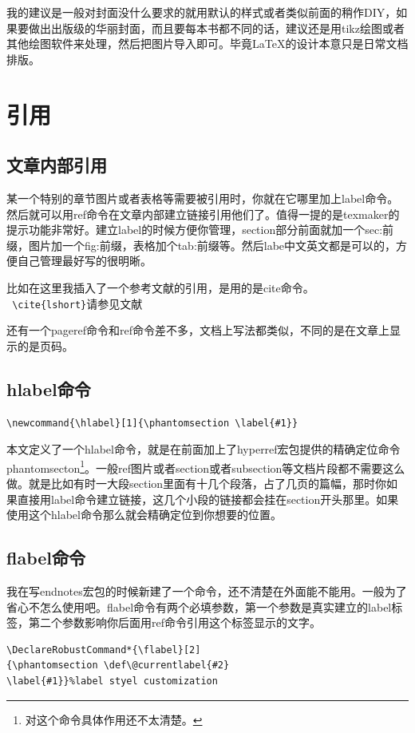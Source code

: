 \documentclass[11pt,oneside]{book}
\begin{document}
我的建议是一般对封面没什么要求的就用默认的样式或者类似前面的稍作DIY，如果要做出出版级的华丽封面，而且要每本书都不同的话，建议还是用tikz绘图或者其他绘图软件来处理，然后把图片导入即可。毕竟\LaTeX 的设计本意只是日常文档排版。





\chapter{引用}
\section{文章内部引用}
某一个特别的章节图片或者表格等需要被引用时，你就在它哪里加上label命令。然后就可以用ref命令在文章内部建立链接引用他们了。值得一提的是texmaker的提示功能非常好。建立label的时候方便你管理，section部分前面就加一个sec:前缀，图片加一个fig:前缀，表格加个tab:前缀等。然后labe中文英文都是可以的，方便自己管理最好写的很明晰。

比如在这里我插入了一个参考文献的引用，是用的是cite命令。\\
\verb+ \cite{lshort}+请参见文献\cite{lshort}

还有一个pageref命令和ref命令差不多，文档上写法都类似，不同的是在文章上显示的是页码。

\section{hlabel命令}
\begin{Verbatim}
\newcommand{\hlabel}[1]{\phantomsection \label{#1}}
\end{Verbatim}

本文定义了一个hlabel命令，就是在前面加上了hyperref宏包提供的精确定位命令phantomsecton\footnote{对这个命令具体作用还不太清楚。}。一般ref图片或者section或者subsection等文档片段都不需要这么做。就是比如有时一大段section里面有十几个段落，占了几页的篇幅，那时你如果直接用label命令建立链接，这几个小段的链接都会挂在section开头那里。如果使用这个hlabel命令那么就会精确定位到你想要的位置。


\section{flabel命令}
我在写endnotes宏包的时候新建了一个命令，还不清楚在外面能不能用。一般为了省心不怎么使用吧。flabel命令有两个必填参数，第一个参数是真实建立的label标签，第二个参数影响你后面用ref命令引用这个标签显示的文字。
\begin{Verbatim}
\DeclareRobustCommand*{\flabel}[2]
{\phantomsection \def\@currentlabel{#2}
\label{#1}}%label styel customization
\end{Verbatim}
\end{document}
